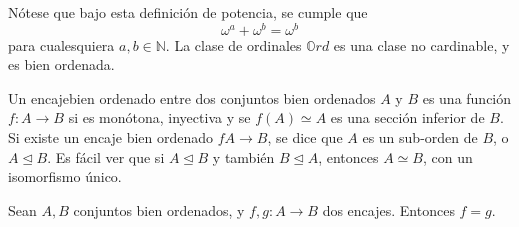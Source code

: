 Nótese que bajo esta definición de potencia, se cumple que 
$$\omega^a+\omega^b=\omega^b$$
para cualesquiera $a,b\in\mathbb{N}$.
La clase de ordinales $\mathbb{O}rd$ es una clase no cardinable, y es bien ordenada.
\begin{defn}
Un encajebien ordenado entre dos conjuntos bien ordenados $A$ y $B$ es una función $f:A\to B$ si es monótona, inyectiva y se $f(A)\simeq A$ es una sección inferior de $B$.
Si existe un encaje bien ordenado $fA\to B$, se dice que $A$ es un sub-orden de $B$, o $A\trianglelefteq B$.
Es fácil ver que si $A\trianglelefteq B$ y también $B\trianglelefteq A$, entonces $A\simeq B$, con un isomorfismo único.
\end{defn}
\begin{exe}%
  Sean $A, B$ conjuntos bien ordenados, y $f,g:A\to B$ dos encajes. Entonces $f=g$.
\end{exe}
